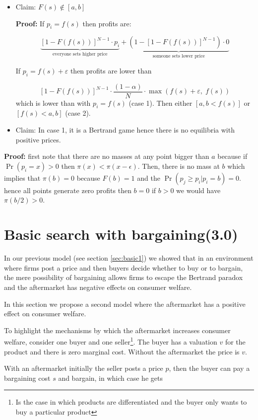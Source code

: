 \documentclass[12pt]{article}
\theoremstyle{plain}
\theoremstyle{plain}
\begin{document}
\begin{itemize}
    \item Claim: $F(s) \notin [a,b]$
 

\textbf{Proof:} If $p_i = f(s)$ then profits are:

\[
\underbrace{[1 - F(f(s))]^{N-1} \cdot p_i}_{\text{everyone sets higher price}} + 
\underbrace{(1 - \left[1 - F(f(s))\right]^{N-1}) \cdot 0}_{\text{someone sets lower price}}
\]


If $p_i = f(s) + \varepsilon$ then profits are lower than

\[
[1 - F(f(s))]^{N-1} \cdot \frac{(1 - \alpha)}{N} \cdot \max(f(s)+\varepsilon,\; f(s))
\]
which is lower than with  $p_i = f(s)$ (case 1). Then either $[a,b < f(s)]$ or $[f(s)< a,b]$ (case 2). 

\item Claim: In case 1, it is a Bertrand game hence there is no equilibria with positive prices. 
\end{itemize}

\textbf{Proof:} first note that there are no masses at any point bigger than $a$ because if $\Pr(p_i = x) > 0$ then $\pi(x) < \pi(x-\epsilon)$. Then, there is no mass at $b$ which implies that $\pi(b) = 0$ because $F(b) =1 $ and the $\Pr(p_j \geq p_i| p_i = b) =  0 $. hence all points generate zero profits then $b =0 $ if $b> 0$ we would have $\pi(b/2) > 0$. 


\section{Basic search with bargaining(3.0)}

In our previous model (see section \ref{sec:basic1}) we showed that in an environment where firms post a price and then buyers decide whether to buy or to bargain, the mere possibility of bargaining allows firms to escape the Bertrand paradox and the aftermarket has negative effects on consumer welfare. 

In this section we propose a second model where the aftermarket has a positive effect on consumer welfare. 

To highlight the mechanisms by which the aftermarket increases consumer welfare, consider one buyer and one seller\footnote{Is the case in which products are differentiated and the buyer only wants to buy a particular product}. The buyer has a valuation $v$ for the product and there is zero marginal cost. Without the aftermarket the price is $v$. 

With an aftermarket initially the seller posts a price $p$, then the buyer can pay a bargaining cost $s$ and bargain, in which case he gets 
\end{document}
